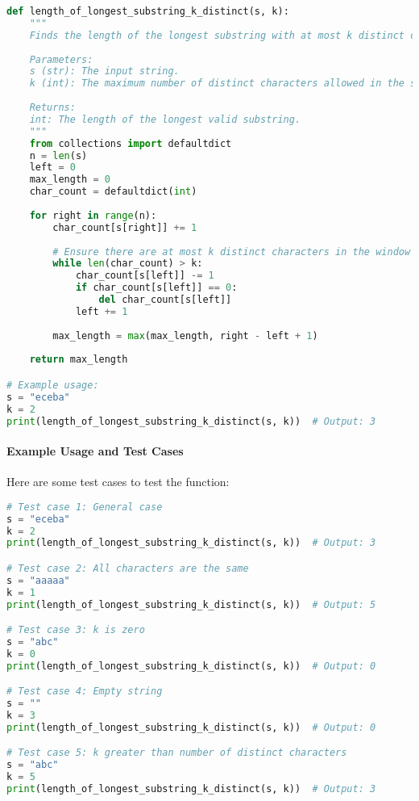 \begin{fullwidth}
\begin{lstlisting}[language=Python]
def length_of_longest_substring_k_distinct(s, k):
    """
    Finds the length of the longest substring with at most k distinct characters.
    
    Parameters:
    s (str): The input string.
    k (int): The maximum number of distinct characters allowed in the substring.
    
    Returns:
    int: The length of the longest valid substring.
    """
    from collections import defaultdict
    n = len(s)
    left = 0
    max_length = 0
    char_count = defaultdict(int)
    
    for right in range(n):
        char_count[s[right]] += 1
        
        # Ensure there are at most k distinct characters in the window
        while len(char_count) > k:
            char_count[s[left]] -= 1
            if char_count[s[left]] == 0:
                del char_count[s[left]]
            left += 1
            
        max_length = max(max_length, right - left + 1)
    
    return max_length

# Example usage:
s = "eceba"
k = 2
print(length_of_longest_substring_k_distinct(s, k))  # Output: 3
\end{lstlisting}
\end{fullwidth}

\paragraph*{Example Usage and Test Cases}

Here are some test cases to test the function:

\begin{lstlisting}[language=Python]
# Test case 1: General case
s = "eceba"
k = 2
print(length_of_longest_substring_k_distinct(s, k))  # Output: 3

# Test case 2: All characters are the same
s = "aaaaa"
k = 1
print(length_of_longest_substring_k_distinct(s, k))  # Output: 5

# Test case 3: k is zero
s = "abc"
k = 0
print(length_of_longest_substring_k_distinct(s, k))  # Output: 0

# Test case 4: Empty string
s = ""
k = 3
print(length_of_longest_substring_k_distinct(s, k))  # Output: 0

# Test case 5: k greater than number of distinct characters
s = "abc"
k = 5
print(length_of_longest_substring_k_distinct(s, k))  # Output: 3
\end{lstlisting}

